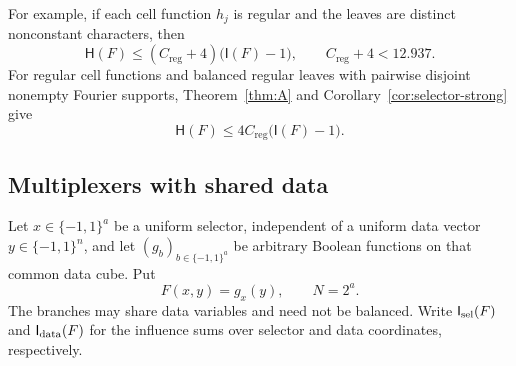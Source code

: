 \documentclass[11pt]{amsart}
\theoremstyle{definition}
\theoremstyle{remark}
\newcommand{\bits}{\{-1,1\}}
\newcommand{\HH}{\mathsf H}
\newcommand{\I}{\mathsf I}
\newcommand{\Creg}{C_{\mathrm{reg}}}
\begin{document}
For example, if each cell function $h_j$ is regular and the leaves are
distinct nonconstant characters, then
\[
 \HH(F)\le(\Creg+4)\bigl(\I(F)-1\bigr),
 \qquad \Creg+4<12.937.
\]
For regular cell functions and balanced regular leaves with pairwise
disjoint nonempty Fourier supports, Theorem~\ref{thm:A} and
Corollary~\ref{cor:selector-strong} give
\[
 \HH(F)\le4\Creg\bigl(\I(F)-1\bigr).
\]

\subsection{Multiplexers with shared data}\label{sec:shared-multiplexers}

Let $x\in\bits^a$ be a uniform selector, independent of a uniform data
vector $y\in\bits^n$, and let $(g_b)_{b\in\bits^a}$ be arbitrary Boolean
functions on that common data cube. Put
\[
 F(x,y)=g_x(y),\qquad N=2^a.
\]
The branches may share data variables and need not be balanced. Write
$\I_{\rm sel}(F)$ and $\I_{\rm data}(F)$ for the influence sums over
selector and data coordinates, respectively.
\end{document}
